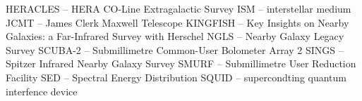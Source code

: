 HERACLES -- HERA CO-Line Extragalactic Survey
ISM -- interstellar medium
JCMT -- James Clerk Maxwell Telescope
KINGFISH -- Key Insights on Nearby Galaxies: a Far-Infrared Survey with Herschel
NGLS -- Nearby Galaxy Legacy Survey
SCUBA-2 -- Submillimetre Common-User Bolometer Array 2
SINGS -- Spitzer Infrared Nearby Galaxy Survey
SMURF -- Submillimetre User Reduction Facility
SED -- Spectral Energy Distribution
SQUID -- supercondting quantum interfence device
